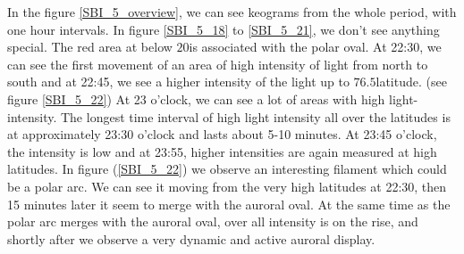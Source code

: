 \documentclass[10pt,a4paper]{article}
\begin{document}
In the figure \ref{SBI_5_overview}, we can see keograms from the whole period, with one hour intervals. In figure \ref{SBI_5_18} to \ref{SBI_5_21}, we don't see anything 
special. The red area at below $20$\textdegree is associated with the polar oval. At 22:30, we can see the first movement of an area of high intensity of light from north to 
south and at 22:45, we see a higher intensity of the light up to $76.5$\textdegree latitude. (see figure \ref{SBI_5_22})
At 23 o'clock, we can see a lot of areas with high light-intensity. The longest time interval of high light intensity all over the latitudes is at approximately 23:30 o'clock and lasts about 5-10 minutes. At 23:45 o'clock, the intensity is low and at 23:55, higher intensities are again measured at high latitudes. In figure (\ref{SBI_5_22}) we 
observe an interesting filament which could be a polar arc. We can see it moving from the very high latitudes at 22:30, then 15 minutes later it seem to merge with the auroral oval. At the same time as the polar arc merges with the auroral oval, over all intensity is on the rise, and shortly after we observe a very dynamic and active auroral display.  
\end{document}
